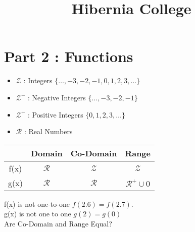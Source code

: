 \documentclass[12 pt]{article}
\title{Hibernia College}
\author{}
\begin{document}
\maketitle



\newpage
\section*{Part 2 : Functions}








\begin{itemize}
\item $\mathcal{Z}$ : Integers $ \{\ldots,-3,-2,-1,0,1,2,3, \ldots\}$
\item $\mathcal{Z}^{-}$ : Negative Integers $\{\ldots,-3,-2,-1\}$
\item $\mathcal{Z}^{+}$ : Positive Integers $\{0,1,2,3, \ldots\}$
\item $\mathcal{R}$ : Real Numbers
\end{itemize}

\begin{tabular}{|c|c|c|c|}
\hline  & Domain & Co-Domain  & Range  \\ 
\hline f(x) & $\mathcal{R}$ & $\mathcal{Z}$ & $\mathcal{Z}$ \\ 
\hline  g(x)& $\mathcal{R}$ & $\mathcal{R}$ & $\mathcal{R}^{+} \cup {0} $\\ 
\hline 
\end{tabular} 
f(x) is not one-to-one $f(2.6) = f(2.7)$.\\
g(x) is not one to one $g(2) =g(0)$\\
Are Co-Domain and Range Equal?\\

\end{document}
